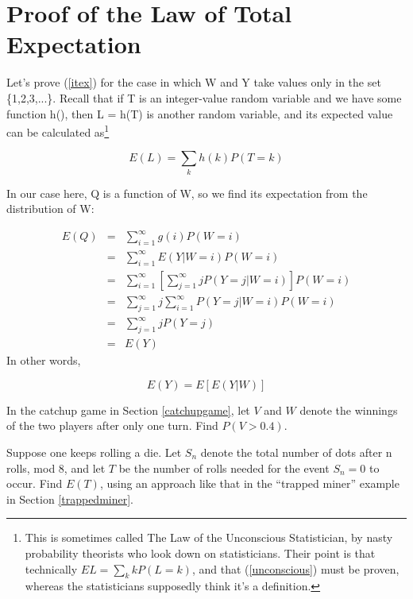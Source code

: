 \section{Proof of the Law of Total Expectation}
\label{proveitex} 

Let's prove (\ref{itex}) for the case in which W and Y take values only
in the set \{1,2,3,...\}.  Recall that if T is an integer-value random
variable and we have some function h(), then L = h(T) is another random
variable, and its expected value can be calculated as\footnote{This is
sometimes called The Law of the Unconscious Statistician, by nasty
probability theorists who look down on statisticians.  Their point is
that technically $EL = \sum_k k P(L = k)$, and that (\ref{unconscious})
must be proven, whereas the statisticians supposedly think it's a
definition.}  

\begin{equation}
\label{unconscious}
E(L) = \sum_k h(k) P(T = k)
\end{equation}

In our case here, Q is a function of W, so we find its expectation from
the distribution of W:

\begin{eqnarray*}
E(Q) & = & \sum ^{\infty }_{i=1}g(i) P(W=i)\\
 & = & \sum ^{\infty }_{i=1}E(Y|W=i)P(W=i)\\
 & = & \sum ^{\infty }_{i=1} \left [ \sum ^{\infty }_{j=1}jP(Y=j|W=i) \right ] P(W=i) \\
 & = & \sum ^{\infty }_{j=1}j\sum ^{\infty }_{i=1}P(Y=j|W=i)P(W=i)\\
 & = & \sum ^{\infty }_{j=1}jP(Y=j)\\
 & = & E(Y)
\end{eqnarray*}
 In other words, 

\begin{equation}
E(Y)=E[E(Y|W)]
\end{equation}

\startproblemset

\oneproblem
In the catchup game in Section \ref{catchupgame}, let $V$ and $W$ denote
the winnings of the two players after only one turn.  Find $P(V > 0.4)$.

\oneproblem 
Suppose one keeps rolling a die. Let $S_n$ denote the total
number of dots after n rolls, mod 8, and let $T$ be the number of rolls
needed for the event $S_n = 0$ to occur. Find $E(T)$, using an approach
like that in the ``trapped miner'' example in Section
\ref{trappedminer}.

